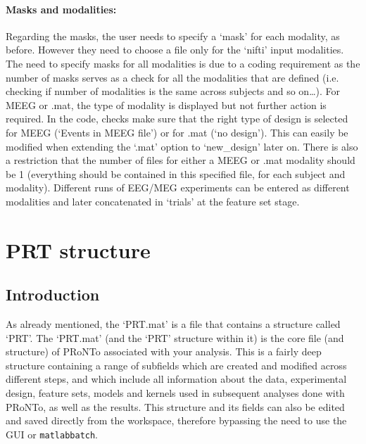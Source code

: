 \paragraph{Masks and modalities:} Regarding the masks, the user needs to specify a `mask' for each modality, as before. However they need to choose a file only for the `nifti' input modalities. The need to specify masks for all modalities is due to a coding requirement as the number of masks serves as a check for all the modalities that are defined (i.e. checking if number of modalities is the same across subjects and so on…). For MEEG or .mat, the type of modality is displayed but not further action is required.
In the code, checks make sure that the right type of design is selected for MEEG (`Events in MEEG file') or for .mat (`no design'). This can easily be modified when extending the `.mat' option to `new\_design' later on. There is also a restriction that the number of files for either a MEEG or .mat modality should be 1 (everything should be contained in this specified file, for each subject and modality). Different runs of EEG/MEG experiments can be entered as different modalities and later concatenated in `trials' at the feature set stage.

\section{PRT structure}

\subsection{Introduction}

As already mentioned, the `PRT.mat' is a file that contains a \matlab{} structure called `PRT'. The `PRT.mat' (and the `PRT' structure within it) is the core file (and structure) of PRoNTo associated with your analysis. This is a fairly deep structure containing a range of subfields which are created and modified across different steps, and which include all information about the data, experimental design, feature sets, models and kernels used in subsequent analyses done with PRoNTo, as well as the results. This structure and its fields can also be edited and saved directly from the \matlab{} workspace, therefore bypassing the need to use the GUI or  {\tt matlabbatch}.
\\

